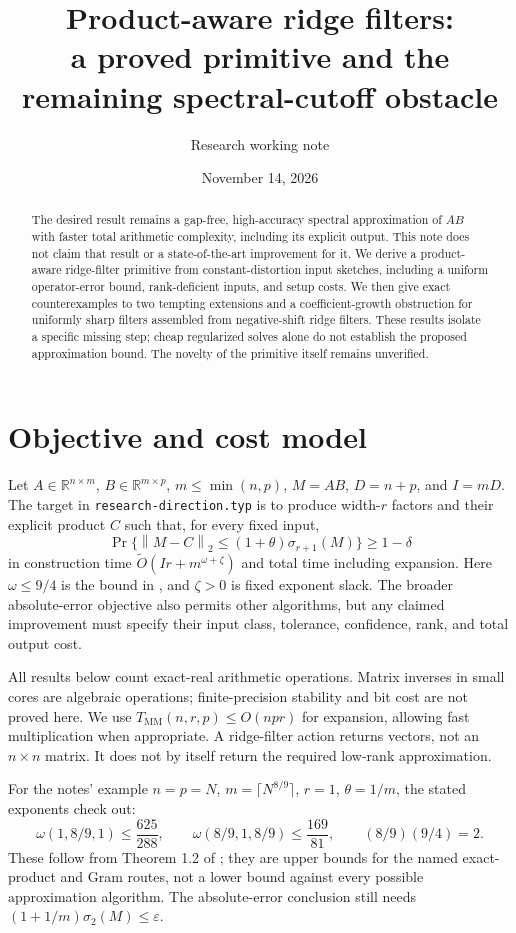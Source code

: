 \documentclass[11pt]{article}
\title{Product-aware ridge filters:\\a proved primitive and the remaining spectral-cutoff obstacle}
\author{Research working note}
\date{November 14, 2026}
\theoremstyle{remark}
\newcommand{\R}{\mathbb R}
\newcommand{\norm}[1]{\left\lVert#1\right\rVert}
\newcommand{\MM}{T_{\mathrm{MM}}}
\newcommand{\tO}{\widetilde O}
\begin{document}
\maketitle
\begin{abstract}
The desired result remains a gap-free, high-accuracy spectral approximation of
\(AB\) with faster total arithmetic complexity, including its explicit output.
This note does not claim that result or a state-of-the-art improvement for it.
We derive a product-aware ridge-filter primitive from constant-distortion input
sketches, including a uniform operator-error bound, rank-deficient inputs, and
setup costs. We then give exact counterexamples to two tempting extensions and
a coefficient-growth obstruction for uniformly sharp filters assembled from
negative-shift ridge filters. These results isolate a specific missing step;
cheap regularized solves alone do not establish the proposed approximation bound.
The novelty of the primitive itself remains unverified.
\end{abstract}

\section{Objective and cost model}
Let \(A\in\R^{n\times m}\), \(B\in\R^{m\times p}\),
\(m\leq\min(n,p)\), \(M=AB\), \(D=n+p\), and \(I=mD\).
The target in \texttt{research-direction.typ} is to produce width-\(r\) factors
and their explicit product \(C\) such that, for every fixed input,
\[
 \Pr\{\norm{M-C}_2\leq(1+\theta)\sigma_{r+1}(M)\}\geq1-\delta
\]
in construction time \(\tO(Ir+m^{\omega+\zeta})\) and total time including
expansion. Here \(\omega\leq9/4\) is the bound in \cite{amanov}, and
\(\zeta>0\) is fixed exponent slack. The broader absolute-error objective
also permits other algorithms, but any claimed improvement must specify their
input class, tolerance, confidence, rank, and total output cost.

All results below count exact-real arithmetic operations. Matrix inverses in
small cores are algebraic operations; finite-precision stability and bit cost
are not proved here. We use
\(\MM(n,r,p)\leq O(npr)\) for expansion, allowing fast multiplication when
appropriate. A ridge-filter action returns vectors, not an \(n\times n\)
matrix. It does not by itself return the required low-rank approximation.

For the notes' example \(n=p=N\), \(m=\lceil N^{8/9}\rceil\),
\(r=1\), \(\theta=1/m\), the stated exponents check out:
\[
 \omega(1,8/9,1)\leq\frac{625}{288},\qquad
 \omega(8/9,1,8/9)\leq\frac{169}{81},\qquad
 (8/9)(9/4)=2.
\]
These follow from Theorem 1.2 of \cite{amanov}; they are upper bounds for
the named exact-product and Gram routes, not a lower bound against every
possible approximation algorithm. The absolute-error conclusion still needs
\((1+1/m)\sigma_2(M)\leq\varepsilon\).
\end{document}
